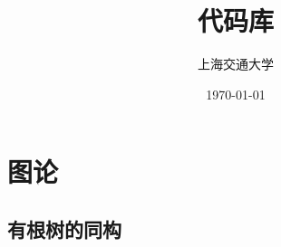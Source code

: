 \documentclass[a4paper]{article}
\title{代码库}
\author{上海交通大学}
\date{\today}
\newcommand{\cppcode}[1]{
    \inputminted[mathescape]{cpp}{source/#1}
}
\begin{document}
\maketitle

\tableofcontents

\clearpage

\section{图论}

\subsection{有根树的同构}

\cppcode{graph-theory/rooted-tree-isomorphism.cpp}
\end{document}
